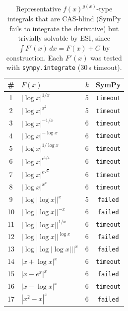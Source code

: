 \begin{table}[t]
  \centering
  \caption{Representative $f(x)^{g(x)}$-type integrals that are CAS-blind (SymPy fails to
  integrate the derivative) but trivially solvable by ESI, since $\int F'(x)\,dx = F(x)+C$
  by construction. Each $F'(x)$ was tested with \texttt{sympy.integrate} (30\,s timeout).}
  \label{tab:fg_integrals}
  \small
  \begin{tabular}{clcc}
    \toprule
    \# & $F(x)$ & $k$ & SymPy \\
    \midrule
    1 & $\left|\log x\right|^{1/x}$ & 5 & \texttt{timeout} \\
    2 & $\left|\log x\right|^{x^{2}}$ & 5 & \texttt{timeout} \\
    3 & $\left|\log x\right|^{-1/x}$ & 6 & \texttt{timeout} \\
    4 & $\left|\log x\right|^{-\log x}$ & 6 & \texttt{timeout} \\
    5 & $\left|\log x\right|^{1/\log x}$ & 6 & \texttt{timeout} \\
    6 & $\left|\log x\right|^{e^{1/x}}$ & 6 & \texttt{timeout} \\
    7 & $\left|\log x\right|^{e^{\sqrt{x}}}$ & 6 & \texttt{timeout} \\
    8 & $\left|\log x\right|^{x^{x}}$ & 6 & \texttt{timeout} \\
    9 & $\left|\log\!\left|\log x\right|\right|^{x}$ & 5 & \texttt{failed} \\
    10 & $\left|\log\!\left|\log x\right|\right|^{-x}$ & 6 & \texttt{failed} \\
    11 & $\left|\log\!\left|\log x\right|\right|^{1/x}$ & 6 & \texttt{timeout} \\
    12 & $\left|\log\!\left|\log x\right|\right|^{\log x}$ & 6 & \texttt{failed} \\
    13 & $\left|\log\!\left|\log\!\left|\log x\right|\right|\right|^{x}$ & 6 & \texttt{failed} \\
    14 & $\left|x + \log x\right|^{x}$ & 6 & \texttt{timeout} \\
    15 & $\left|x - e^{x}\right|^{x}$ & 6 & \texttt{failed} \\
    16 & $\left|x - \log x\right|^{x}$ & 6 & \texttt{timeout} \\
    17 & $\left|x^{2} - x\right|^{x}$ & 6 & \texttt{failed} \\
    \bottomrule
  \end{tabular}
\end{table}